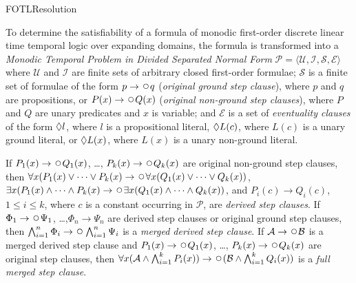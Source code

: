 \begin{entry}{FOTLResolution}

 \begin{clarifications}
%
To determine the satisfiability of a formula of monodic first-order
discrete linear time temporal logic over expanding domains, the
formula is transformed into a \emph{Monodic Temporal Problem
in Divided Separated Normal Form}
$\mathcal{P} = \langle \mathcal{U, I, S, E} \rangle$ 
where $\mathcal{U}$
and $\mathcal{I}$ 
are finite sets of arbitrary closed first-order formulae;
$\mathcal{S}$ 
is a finite set of formulae of the form
$p\rightarrow\Next q$ (\emph{original ground step clause}), 
where $p$ and $q$ are propositions, or
$P(x)\rightarrow\Next Q(x)$ (\emph{original non-ground step clauses}), 
where $P$ and $Q$ are unary predicates and $x$ is variable; and
$\mathcal{E}$  
is a set of \emph{eventuality clauses}
of the form $\Diamond l$, where $l$ is a propositional literal,
$\Diamond L(c)$, where $L(c)$ is a unary ground literal,
or
$\Diamond L(x)$, where $L(x)$ is a unary non-ground literal.

If $P_1(x)\rightarrow\Next Q_1(x)$, \dots, $P_k(x)\rightarrow\Next Q_k(x)$ are
original non-ground step clauses, then
$\forall x (P_1(x)\lor\dots\lor P_k(x)\rightarrow\Next
 \forall x (Q_1(x)\lor\dots\lor Q_k(x))$,
$\exists x (P_1(x)\land\dots\land P_k(x)\rightarrow\Next
 \exists x (Q_1(x)\land\dots\land Q_k(x))$, and
$P_i(c)\rightarrow Q_i(c)$, $1\leq i\leq k$, where $c$ is a constant
occurring in $\mathcal{P}$, are \emph{derived step clauses}.
If $\Phi_1\rightarrow\Next\Psi_1$, \dots,$\Phi_n\rightarrow\Psi_n$
are derived step clauses or original ground step clauses, then
$\bigwedge_{i=1}^n\Phi_i\rightarrow\Next\bigwedge_{i=1}^n\Psi_i$ is a
\emph{merged derived step clause}. 
If $\mathcal{A}\rightarrow\Next\mathcal{B}$ is a merged derived step
clause and $P_1(x)\rightarrow\Next Q_1(x)$, \dots,
$P_k(x)\rightarrow\Next Q_k(x)$ are original step clauses,
then $\forall x (\mathcal{A}\land\bigwedge_{i=1}^k P_i(x))
\rightarrow\Next (\mathcal{B}\land\bigwedge_{i=1}^k Q_i(x))$
is a \emph{full merged step clause}.
\end{clarifications}


\end{entry}
